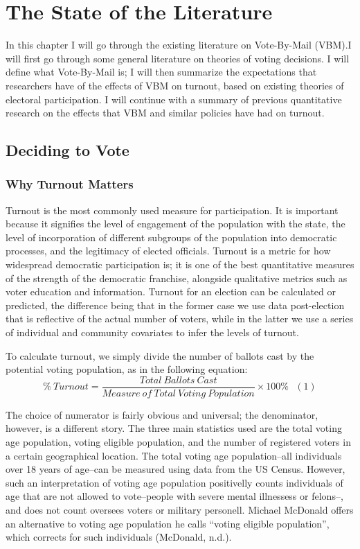 \documentclass[12pt,twoside]{reedthesis}
\begin{document}
  \chapter{The State of the Literature}\label{rmd-basics}
  
  In this chapter I will go through the existing literature on
  Vote-By-Mail (VBM).I will first go through some general literature on
  theories of voting decisions. I will define what Vote-By-Mail is; I will
  then summarize the expectations that researchers have of the effects of
  VBM on turnout, based on existing theories of electoral participation. I
  will continue with a summary of previous quantitative research on the
  effects that VBM and similar policies have had on turnout.
  
  \section{Deciding to Vote}\label{deciding-to-vote}
  
  \subsection{Why Turnout Matters}\label{why-turnout-matters}
  
  Turnout is the most commonly used measure for participation. It is
  important because it signifies the level of engagement of the population
  with the state, the level of incorporation of different subgroups of the
  population into democratic processes, and the legitimacy of elected
  officials. Turnout is a metric for how widespread democratic
  participation is; it is one of the best quantitative measures of the
  strength of the democratic franchise, alongside qualitative metrics such
  as voter education and information. Turnout for an election can be
  calculated or predicted, the difference being that in the former case we
  use data post-election that is reflective of the actual number of
  voters, while in the latter we use a series of individual and community
  covariates to infer the levels of turnout.
  
  To calculate turnout, we simply divide the number of ballots cast by the
  potential voting population, as in the following equation:\\
  \[ \% ~Turnout = \frac{Total~Ballots~Cast}{Measure~of~Total~Voting~Population}\times100\%~~~(1)\]
  
  The choice of numerator is fairly obvious and universal; the
  denominator, however, is a different story. The three main statistics
  used are the total voting age population, voting eligible population,
  and the number of registered voters in a certain geographical location.
  The total voting age population--all individuals over 18 years of
  age--can be measured using data from the US Census. However, such an
  interpretation of voting age population positivelly counts individuals
  of age that are not allowed to vote--people with severe mental
  illnessess or felons--, and does not count oversees voters or military
  personell. Michael McDonald offers an alternative to voting age
  population he calls ``voting eligible population'', which corrects for
  such individuals (McDonald, n.d.).
  
\end{document}
